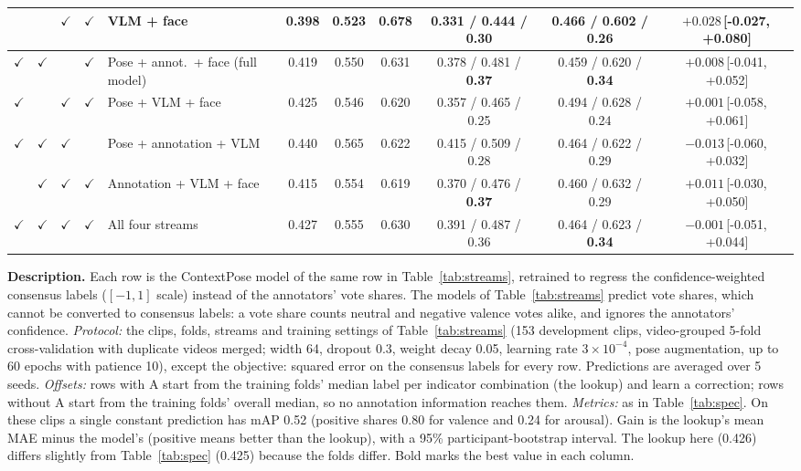 \documentclass[11pt]{article}
\newcommand{\best}[1]{\textbf{#1}}
\newcommand{\ci}[2]{\,[#1,\,#2]}
\newcommand{\tabledesc}[1]{\par\medskip\begin{minipage}{\linewidth}\footnotesize\textbf{Description.} #1\end{minipage}}
\begin{document}
\begin{table}[!htbp]
{\begin{tabular}{cccclcccccc}
 & & $\checkmark$ & $\checkmark$ & \best{VLM + face} & \best{0.398} & \best{0.523} & \best{0.678} & \best{0.331} / \best{0.444} / 0.30 & 0.466 / \best{0.602} / 0.26 & \best{$+0.028$}\ci{-0.027}{+0.080} \\
\midrule
$\checkmark$ & $\checkmark$ & & $\checkmark$ & Pose + annot.\ + face (full model) & 0.419 & 0.550 & 0.631 & 0.378 / 0.481 / \best{0.37} & 0.459 / 0.620 / \best{0.34} & $+0.008$\ci{-0.041}{+0.052} \\
$\checkmark$ & & $\checkmark$ & $\checkmark$ & Pose + VLM + face & 0.425 & 0.546 & 0.620 & 0.357 / 0.465 / 0.25 & 0.494 / 0.628 / 0.24 & $+0.001$\ci{-0.058}{+0.061} \\
$\checkmark$ & $\checkmark$ & $\checkmark$ & & Pose + annotation + VLM & 0.440 & 0.565 & 0.622 & 0.415 / 0.509 / 0.28 & 0.464 / 0.622 / 0.29 & $-0.013$\ci{-0.060}{+0.032} \\
 & $\checkmark$ & $\checkmark$ & $\checkmark$ & Annotation + VLM + face & 0.415 & 0.554 & 0.619 & 0.370 / 0.476 / \best{0.37} & 0.460 / 0.632 / 0.29 & $+0.011$\ci{-0.030}{+0.050} \\
\midrule
$\checkmark$ & $\checkmark$ & $\checkmark$ & $\checkmark$ & All four streams & 0.427 & 0.555 & 0.630 & 0.391 / 0.487 / 0.36 & 0.464 / 0.623 / \best{0.34} & $-0.001$\ci{-0.051}{+0.044} \\
\bottomrule
\end{tabular}%
}
\tabledesc{Each row is the ContextPose model of the same row in Table~\ref{tab:streams}, retrained to regress the confidence-weighted consensus labels ($[-1, 1]$ scale) instead of the annotators' vote shares. The models of Table~\ref{tab:streams} predict vote shares, which cannot be converted to consensus labels: a vote share counts neutral and negative valence votes alike, and ignores the annotators' confidence.
\emph{Protocol:} the clips, folds, streams and training settings of Table~\ref{tab:streams} (153 development clips, video-grouped 5-fold cross-validation with duplicate videos merged; width 64, dropout 0.3, weight decay 0.05, learning rate $3\times10^{-4}$, pose augmentation, up to 60 epochs with patience 10), except the objective: squared error on the consensus labels for every row. Predictions are averaged over 5 seeds.
\emph{Offsets:} rows with A start from the training folds' median label per indicator combination (the lookup) and learn a correction; rows without A start from the training folds' overall median, so no annotation information reaches them.
\emph{Metrics:} as in Table~\ref{tab:spec}. On these clips a single constant prediction has mAP 0.52 (positive shares 0.80 for valence and 0.24 for arousal). Gain is the lookup's mean MAE minus the model's (positive means better than the lookup), with a 95\% participant-bootstrap interval. The lookup here (0.426) differs slightly from Table~\ref{tab:spec} (0.425) because the folds differ. Bold marks the best value in each column.
}
\end{table}
\end{document}
